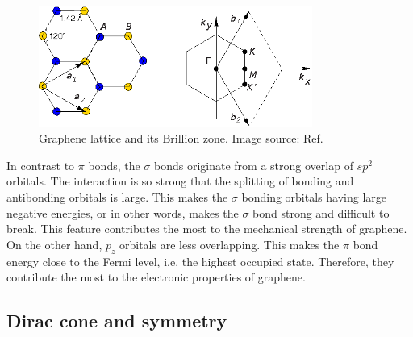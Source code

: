 \begin{figure}[htbp!] 
\centering  
\includegraphics[width=0.8\textwidth]{gra_lat.eps}
\caption[Graphene lattice and its Brillion zone]{ Graphene lattice and its Brillion zone. Image source: Ref. \cite{CastroNeto2009} }  
\label{fig:gra_lat}
\end{figure} 

In contrast to $\pi$ bonds, the $\sigma$ bonds originate from a strong overlap of $sp^2$ orbitals. The interaction is so strong that the splitting of bonding and antibonding orbitals is large. This makes the $\sigma$ bonding orbitals having large negative energies, or in other words, makes the $\sigma$ bond strong and difficult to break. This feature contributes the most to the mechanical strength of graphene. On the other hand, $p_z$ orbitals are less overlapping. This makes the $\pi$ bond energy close to the Fermi level, i.e. the highest occupied state. Therefore, they contribute the most to the electronic properties of graphene.  


\subsection{Dirac cone and symmetry}

